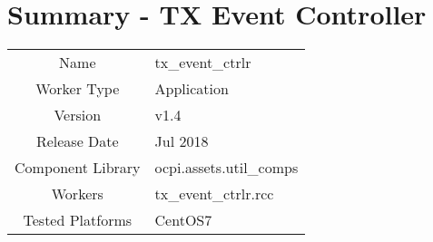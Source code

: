 \documentclass{article}
\author{} %
\date{Version \docVersion} %
\title{\docTitle}
\def\docVersion{1.4}
\def\comp{tx\_event\_ctrlr}
\def\Comp{TX Event Controller}
\begin{document}
\section*{Summary - \Comp}
\begin{tabular}{|c|M{13.5cm}|}
	\hline
	                  &                                                    \\
	\hline
	Name              & \comp                                              \\
	\hline
	Worker Type       & Application                                        \\
	\hline
	Version           & v\docVersion \\
	\hline
	Release Date      & Jul 2018 \\
	\hline
	Component Library & ocpi.assets.util\_comps                             \\
	\hline
	Workers           & \comp.rcc                                           \\
	\hline
	Tested Platforms  & CentOS7 \\
	\hline
\end{tabular}
\end{document}
